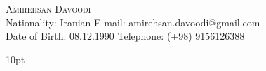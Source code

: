 \documentclass[9pt]{article}
\newenvironment{changemargin}[2]{%
  \begin{list}{}{%
    \setlength{\topsep}{0pt}%
    \setlength{\leftmargin}{#1}%
    \setlength{\rightmargin}{#2}%
    \setlength{\listparindent}{\parindent}%
    \setlength{\itemindent}{\parindent}%
    \setlength{\parsep}{\parskip}%
  }%
  \item[]}{\end{list}
}
\newcommand{\lineover}{
	\begin{changemargin}{-0.05in}{-0.05in}
		\vspace*{-8pt}
		\hrulefill \\
		\vspace*{-2pt}
	\end{changemargin}
}
\newcommand{\header}[1]{
	\begin{changemargin}{-0.5in}{-0.5in}
		\scshape{#1}\\
  	\lineover
	\end{changemargin}
}
\newcommand{\contact}[4]{
	\begin{changemargin}{-0.5in}{-0.5in}
			{\Large \scshape {#1}}\\ \smallskip
			{#2}\\ \smallskip
			{#3}\\ \smallskip
			{#4}\smallskip
	\end{changemargin}
}
\newenvironment{body} {
	\vspace*{-16pt}
	\begin{changemargin}{-0.25in}{-0.5in}
  }	
	{\end{changemargin}
}
\begin{document}
\contact{Amirehsan Davoodi}
{Nationality: \hspace{0.5cm} Iranian \hfill E-mail: amirehsan.davoodi@gmail.com}
{Date of Birth: \hspace{0.15cm} 08.12.1990 \hfill Telephone: (+98) 9156126388}


\vspace{10pt}
\end{document}
